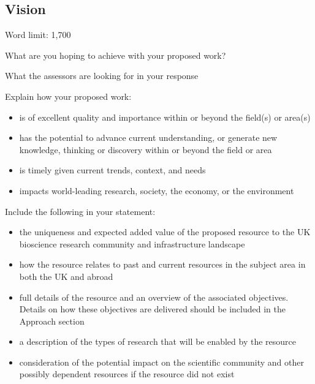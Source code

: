 \documentclass[12in]{article}
\begin{document}
\subsection{Vision}

{\color{red}

Word limit: 1,700

What are you hoping to achieve with your proposed work?

What the assessors are looking for in your response

Explain how your proposed work:

\begin{itemize}

\item is of excellent quality and importance within or beyond the field(s) or area(s)

\item has the potential to advance current understanding, or generate new
knowledge, thinking or discovery within or beyond the field or area

\item is timely given current trends, context, and needs

\item impacts world-leading research, society, the economy, or the environment

\end{itemize}

Include the following in your statement:

\begin{itemize}

\item the uniqueness and expected added value of the proposed resource to the
UK bioscience research community and infrastructure landscape

\item how the resource relates to past and current resources in the subject area in
both the UK and abroad

\item full details of the resource and an overview of the associated objectives.
Details on how these objectives are delivered should be included in the
Approach section

\item a description of the types of research that will be enabled by the resource

\item consideration of the potential impact on the scientific community and other
possibly dependent resources if the resource did not exist


\end{itemize}}
\end{document}
